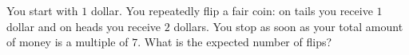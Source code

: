 You start with $1$ dollar. You repeatedly flip a fair coin: on tails you receive $1$ dollar and on heads you receive $2$ dollars. You stop as soon as your total amount of money is a multiple of $7$. What is the expected number of flips?
